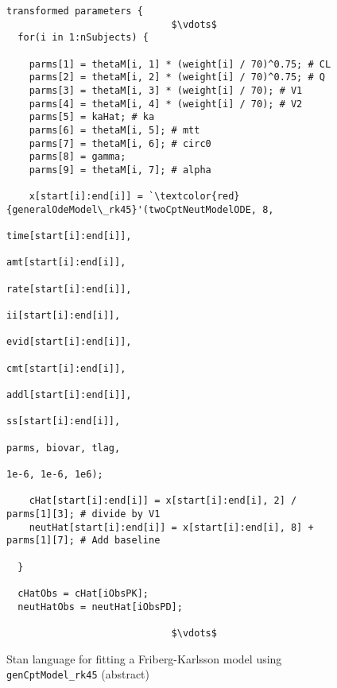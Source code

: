 \documentclass[11pt]{amsart}
\newenvironment{fmpage}[1]
     {\begin{lrbox}{\fmbox}\begin{minipage}{#1}}
     {\end{minipage}\end{lrbox}\fbox{\usebox{\fmbox}}}
\begin{document}
\begin{figure}
\caption{Stan language for fitting a Friberg-Karlsson model using \texttt{genCptModel\_rk45} (abstract)}
\begin{tiny}
\begin{center}
\begin{fmpage}{\textwidth - .75in}
\begin{lstlisting}[basicstyle=\tiny\ttfamily,mathescape=true,flexiblecolumns=true,frame=single,escapeinside=`']
transformed parameters {
                             $\vdots$
  for(i in 1:nSubjects) {

    parms[1] = thetaM[i, 1] * (weight[i] / 70)^0.75; # CL
    parms[2] = thetaM[i, 2] * (weight[i] / 70)^0.75; # Q
    parms[3] = thetaM[i, 3] * (weight[i] / 70); # V1
    parms[4] = thetaM[i, 4] * (weight[i] / 70); # V2
    parms[5] = kaHat; # ka
    parms[6] = thetaM[i, 5]; # mtt
    parms[7] = thetaM[i, 6]; # circ0
    parms[8] = gamma;
    parms[9] = thetaM[i, 7]; # alpha

    x[start[i]:end[i]] = `\textcolor{red}{generalOdeModel\_rk45}'(twoCptNeutModelODE, 8,
                                                           time[start[i]:end[i]], 
                                                           amt[start[i]:end[i]], 
                                                           rate[start[i]:end[i]], 
                                                           ii[start[i]:end[i]], 
                                                           evid[start[i]:end[i]], 
                                                           cmt[start[i]:end[i]], 
                                                           addl[start[i]:end[i]], 
                                                           ss[start[i]:end[i]],
                                                           parms, biovar, tlag,
                                                           1e-6, 1e-6, 1e6);

    cHat[start[i]:end[i]] = x[start[i]:end[i], 2] / parms[1][3]; # divide by V1
    neutHat[start[i]:end[i]] = x[start[i]:end[i], 8] + parms[1][7]; # Add baseline
    
  }
  
  cHatObs = cHat[iObsPK];
  neutHatObs = neutHat[iObsPD];

                             $\vdots$  
\end{lstlisting}
\end{fmpage}
\end{center}
\end{tiny} 
\label{FKCode}
\end{figure}
\end{document}
